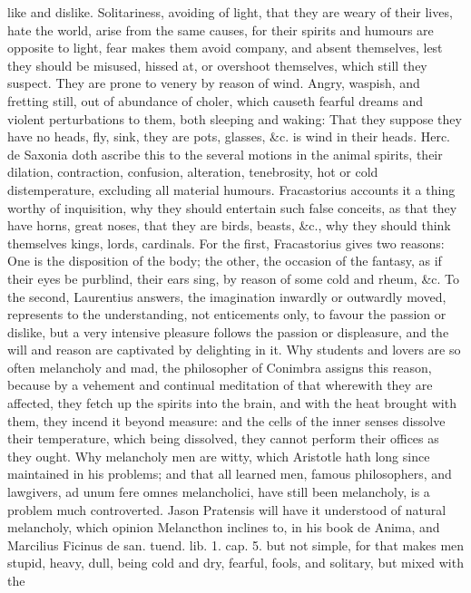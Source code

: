 {like and dislike. Solitariness, avoiding of light, that they are weary
of their lives, hate the world, arise from the same causes, for their
spirits and humours are opposite to light, fear makes them avoid
company, and absent themselves, lest they should be misused, hissed at,
or overshoot themselves, which still they suspect. They are prone to
venery by reason of wind. Angry, waspish, and fretting still, out of
abundance of choler, which causeth fearful dreams and violent
perturbations to them, both sleeping and waking: That they suppose they
have no heads, fly, sink, they are pots, glasses, \&c. is wind in their
heads. Herc. de Saxonia doth ascribe this to the several motions
in the animal spirits, their dilation, contraction, confusion,
alteration, tenebrosity, hot or cold distemperature, excluding all
material humours. Fracastorius accounts it a thing worthy of
inquisition, why they should entertain such false conceits, as that
they have horns, great noses, that they are birds, beasts, \&c., why
they should think themselves kings, lords, cardinals. For the first,
 Fracastorius gives two reasons: One is the disposition of the
body; the other, the occasion of the fantasy, as if their eyes be
purblind, their ears sing, by reason of some cold and rheum, \&c. To the
second, Laurentius answers, the imagination inwardly or outwardly
moved, represents to the understanding, not enticements only, to favour
the passion or dislike, but a very intensive pleasure follows the
passion or displeasure, and the will and reason are captivated by
delighting in it.
Why students and lovers are so often melancholy and mad, the
philosopher of Conimbra assigns this reason, because by a
vehement and continual meditation of that wherewith they are affected,
they fetch up the spirits into the brain, and with the heat brought
with them, they incend it beyond measure: and the cells of the inner
senses dissolve their temperature, which being dissolved, they cannot
perform their offices as they ought.
Why melancholy men are witty, which Aristotle hath long since
maintained in his problems; and that all learned men, famous
philosophers, and lawgivers, ad unum fere omnes melancholici, have
still been melancholy, is a problem much controverted. Jason Pratensis
will have it understood of natural melancholy, which opinion Melancthon
inclines to, in his book de Anima, and Marcilius Ficinus de san. tuend.
lib. 1. cap. 5. but not simple, for that makes men stupid, heavy, dull,
being cold and dry, fearful, fools, and solitary, but mixed with the
}
